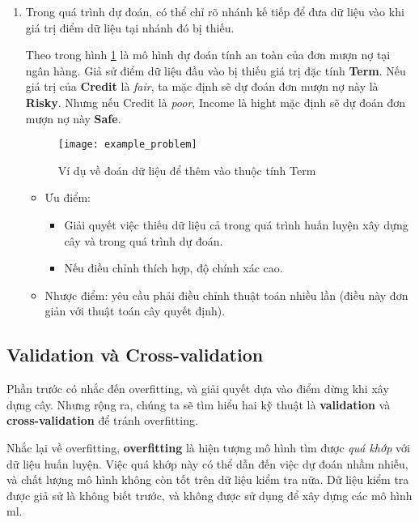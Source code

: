 \documentclass[../main-report.tex]{subfiles}
\begin{document}
\begin{enumerate}
\item Trong quá trình dự đoán, có thể chỉ rõ nhánh kế tiếp để đưa dữ liệu vào khi giá trị điểm dữ liệu tại nhánh đó bị thiếu.

\begin{example}
Theo trong hình \ref{fig:ex_term_problem} là mô hình dự đoán tính an toàn của đơn mượn nợ tại ngân hàng. Giả sử điểm dữ liệu đầu vào bị thiếu giá trị đặc tính \textbf{Term}. Nếu giá trị của \textbf{Credit} là \emph{fair}, ta mặc định sẽ dự đoán đơn mượn nợ này là \textbf{Risky}. Nhưng nếu Credit là \emph{poor}, Income là hight mặc định sẽ dự đoán đơn mượn nợ này \textbf{Safe}.
\end{example}

\begin{figure}[ht!]
\centering\texttt{[image: example\_problem]}
\caption{Ví dụ về đoán dữ liệu để thêm vào thuộc tính Term}
\label{fig:ex_term_problem}
\end{figure}

\begin{itemize}
\item Ưu điểm:
\begin{itemize}
\item Giải quyết việc thiếu dữ liệu cả trong quá trình huấn luyện xây dựng cây và trong quá trình dự đoán.
\item Nếu điều chỉnh thích hợp, độ chính xác cao.
\end{itemize}
\item Nhược điểm: yêu cầu phải điều chỉnh thuật toán nhiều lần (điều này đơn giản với thuật toán cây quyết định).
\end{itemize}
\end{enumerate}

\subsection{Validation và Cross-validation}
Phần trước có nhắc đến overfitting, và giải quyết dựa vào điểm dừng khi xây dựng cây. Nhưng rộng ra, chúng ta sẽ tìm hiểu hai kỹ thuật là \textbf{validation} và \textbf{cross-validation} để tránh overfitting.

Nhắc lại về overfitting, \textbf{overfitting} là hiện tượng mô hình tìm được \emph{quá khớp} với dữ liệu huấn luyện. Việc quá khớp này có thể dẫn đến việc dự đoán nhầm nhiễu, và chất lượng mô hình không còn tốt trên dữ liệu kiểm tra nữa. Dữ liệu kiểm tra được giả sử là không biết trước, và không được sử dụng để xây dựng các mô hình \gls{ml}.
\end{document}
